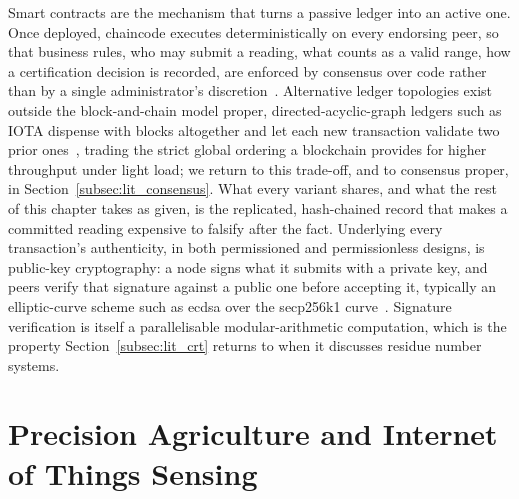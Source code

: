 \documentclass[12pt,a4paper,oneside]{book}
\begin{document}
Smart contracts are the mechanism that turns a passive ledger into an
active one. Once deployed, chaincode executes deterministically on every
endorsing peer, so that business rules, who may submit a reading, what
counts as a valid range, how a certification decision is recorded, are
enforced by consensus over code rather than by a single administrator's
discretion~\cite{krstic2020hyperledgerframeworks, tang2025applicationsblockchain}.
Alternative ledger topologies exist outside the block-and-chain model
proper, directed-acyclic-graph ledgers such as IOTA dispense with blocks
altogether and let each new transaction validate two prior
ones~\cite{anonndimprovedblockchain}, trading the strict global ordering a
blockchain provides for higher throughput under light load; we return to
this trade-off, and to consensus proper, in
Section~\ref{subsec:lit_consensus}. What every variant shares, and what
the rest of this chapter takes as given, is the replicated, hash-chained
record that makes a committed reading expensive to falsify after the fact.
Underlying every transaction's authenticity, in both permissioned and
permissionless designs, is public-key cryptography: a node signs what it
submits with a private key, and peers verify that signature against a
public one before accepting it, typically an elliptic-curve scheme such as
\gls{ecdsa} over the secp256k1 curve~\cite{anon2024securitysecp}. Signature
verification is itself a parallelisable modular-arithmetic computation,
which is the property Section~\ref{subsec:lit_crt} returns to when it
discusses residue number systems.

\section{Precision Agriculture and Internet of Things Sensing}
\label{subsec:lit_precision_ag}
\end{document}
